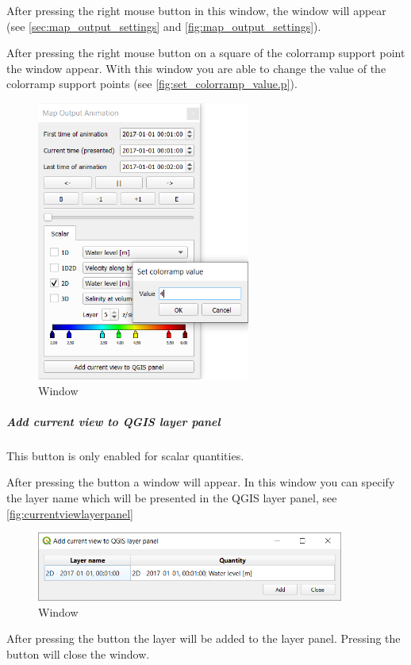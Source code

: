 \documentclass{deltares_memo}
\begin{document}
After pressing the right mouse button in this window, the window  will appear (see  \autoref{sec:map_output_settings} and \autoref{fig:map_output_settings}).

After pressing the right mouse button on a square of the colorramp support point the window  appear.
With this window you are able to change the value of the colorramp support points (see \autoref{fig:set_colorramp_value.p}).
\begin{figure}[H]
	\includegraphics[width=0.625\textwidth]{pictures/set_colorramp_value.png}
	\caption{Window \label{fig:currentviewlayerpanel}}
\end{figure}
\subparagraph*{Add current view to QGIS layer panel}
\Note This button is only enabled for scalar quantities.

After pressing the button  a window  will appear.
In this window you can specify the layer name which will be presented in the QGIS layer panel, see \autoref{fig:currentviewlayerpanel}
\begin{figure}[H]
	\centering
	\includegraphics[width=0.90\textwidth]{pictures/current_view_add.png}
	\caption{Window \label{fig:currentviewlayerpanel}}
\end{figure}
After pressing the button  the layer will be added to the layer panel.
Pressing the  button will close the window.
\end{document}
